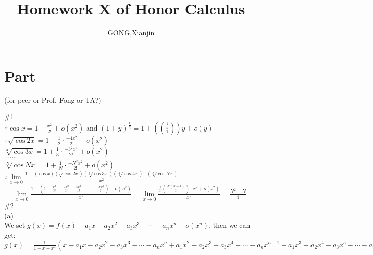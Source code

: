 \documentclass{article}
\author{GONG,Xianjin}
\title{Homework X of Honor Calculus}
\begin{document}
\maketitle

\section{\textcolor[rgb]{0.70,0.00,0.00}{Part \uppercase\expandafter{}}}(for peer or Prof. Fong or TA?)

\vspace{3.5mm}

\textcolor[rgb]{0.00,0.00,0.50}{\#1}\\

$\because$\qquad$\cos x=1-\displaystyle\frac{x^2}{2!}+o(x^2)$ and $\displaystyle(1+y)^{\frac{1}{n}}=1+\left(\binom{\frac{1}{n}}{1}\right)y+o(y)$\\

$\therefore$\qquad$\displaystyle\sqrt{\cos 2x}=1+\frac{1}{2}\cdot\frac{-4x^2}{2!}+o(x^2)$\\

\quad\qquad$\displaystyle\sqrt[3]{\cos 3x}=1+\frac{1}{3}\cdot\frac{-3^2x^2}{2!}+o(x^2)$\\

$\cdots\cdots$\\

\quad\qquad$\displaystyle\sqrt[N]{\cos Nx}=1+\frac{1}{N}\cdot\frac{-N^2x^2}{2!}+o(x^2)$\\

$\therefore$\qquad$\lim \limits_{x \to 0}\displaystyle\frac{1-(\cos x)(\sqrt{\cos 2x})(\sqrt[3]{\cos 3x})(\sqrt[4]{\cos 4x})\cdots(\sqrt[N]{\cos Nx})}{x^2}$\\

\qquad$=\lim \limits_{x \to 0}\frac{1-\left(1-\frac{x^2}{2!}-\frac{2x^2}{2!}-\frac{3x^2}{x!}-\cdots-\frac{Nx^2}{2!}\right)+o(x^2)}{x^2}=\lim \limits_{x \to 0}\frac{\frac{1}{2!}\left(\frac{N(N-1)}{2}\right)\cdot x^2+o(x^2)}{x^2}=\frac{N^2-N}{4}$\\

\textcolor[rgb]{0.00,0.00,0.50}{\#2}\\

(a)\\

We set $g(x)=f(x)-a_1x-a_2x^2-a_3x^3-\cdots-a_nx^n+o(x^n)$, then we can get:\\

$g(x)=\displaystyle\frac{1}{1-x-x^2}(x-a_1x-a_2x^2-a_3x^3-\cdots-a_nx^n+a_1x^2-a_2x^3-a_3x^4-\cdots-a_nx^{n+1}+a_1x^3-a_2x^4-a_3x^5-\cdots-a_nx^{n+2})+o(x^n)$\\
\end{document}
